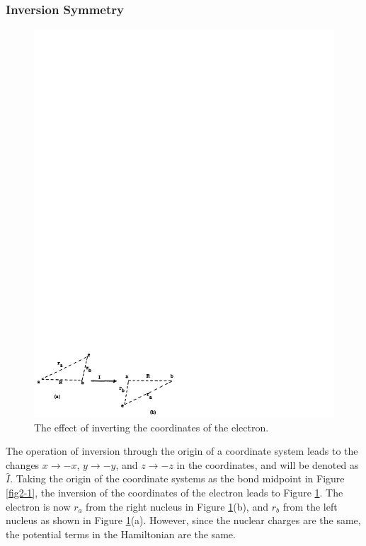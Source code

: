 \subsubsection{Inversion Symmetry}
    
\begin{figure}
\begin{center}
\includegraphics[scale=0.75]{fig2-12}
\end{center}
\caption{The effect of inverting the coordinates of the electron.}
\label{fig2-12}
\end{figure}

The operation of inversion through the origin of a coordinate system
leads to the changes $x \rightarrow - x$, $y \rightarrow -y$, and $z
\rightarrow -z$ in the coordinates, and will be denoted as ${\hat
I}$. Taking the origin of the coordinate systems as the bond midpoint
in Figure \ref{fig2-1}, the inversion of the coordinates of the
electron leads to Figure \ref{fig2-12}.  The electron is now $r_a$
from the right nucleus in Figure \ref{fig2-12}(b), and $r_b$ from the
left nucleus as shown in Figure \ref{fig2-12}(a).  However, since the
nuclear charges are the same, the potential terms in the Hamiltonian
are the same.
    
